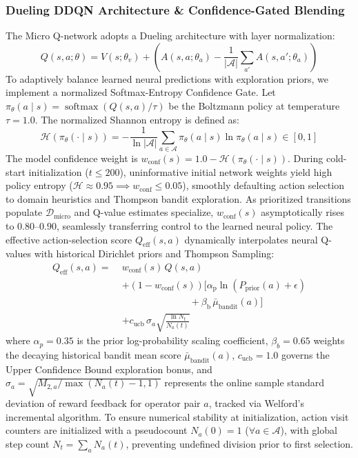 \subsubsection{Dueling DDQN Architecture \& Confidence-Gated Blending}
The Micro Q-network adopts a Dueling architecture \cite{wang2016dueling} with layer normalization:
\begin{equation}
  Q(s, a; \theta) = V(s; \theta_v) + \left( A(s, a; \theta_a) - \frac{1}{|\mathcal{A}|} \sum_{a'} A(s, a'; \theta_a) \right)
  \label{eq:dueling_q}
\end{equation}
To adaptively balance learned neural predictions with exploration priors, we implement a normalized Softmax-Entropy Confidence Gate. Let $\pi_{\theta}(a \mid s) = \operatorname{softmax}(Q(s, a)/\tau)$ be the Boltzmann policy at temperature $\tau = 1.0$. The normalized Shannon entropy is defined as:
\begin{equation}
  \mathcal{H}(\pi_{\theta}(\cdot \mid s)) = -\frac{1}{\ln |\mathcal{A}|} \sum_{a \in \mathcal{A}} \pi_{\theta}(a \mid s) \ln \pi_{\theta}(a \mid s) \in [0, 1]
  \label{eq:policy_entropy}
\end{equation}
The model confidence weight is $w_{\text{conf}}(s) = 1.0 - \mathcal{H}(\pi_{\theta}(\cdot \mid s))$. During cold-start initialization ($t \le 200$), uninformative initial network weights yield high policy entropy ($\mathcal{H} \approx 0.95 \implies w_{\text{conf}} \le 0.05$), smoothly defaulting action selection to domain heuristics and Thompson bandit exploration. As prioritized transitions populate $\mathcal{D}_{\text{micro}}$ and Q-value estimates specialize, $w_{\text{conf}}(s)$ asymptotically rises to $0.80\text{--}0.90$, seamlessly transferring control to the learned neural policy. The effective action-selection score $Q_{\text{eff}}(s, a)$ dynamically interpolates neural Q-values with historical Dirichlet priors and Thompson Sampling:
\begin{align}
  Q_{\text{eff}}(s, a) = \; &w_{\text{conf}}(s)\,Q(s, a) \nonumber \\
  &+ (1 - w_{\text{conf}}(s))\Big[ \alpha_{\text{p}}\ln(P_{\text{prior}}(a) + \epsilon) \nonumber \\
  &\qquad\qquad\qquad\quad + \beta_{\text{b}}\,\bar{\mu}_{\text{bandit}}(a) \Big] \nonumber \\
  &+ c_{\text{ucb}}\,\sigma_a \sqrt{\frac{\ln N_t}{N_a(t)}}
  \label{eq:q_eff_blending}
\end{align}
where $\alpha_p = 0.35$ is the prior log-probability scaling coefficient, $\beta_b = 0.65$ weights the decaying historical bandit mean score $\bar{\mu}_{\text{bandit}}(a)$, $c_{\text{ucb}} = 1.0$ governs the Upper Confidence Bound exploration bonus, and $\sigma_a = \sqrt{M_{2, a}/\max(N_a(t) - 1, 1)}$ represents the online sample standard deviation of reward feedback for operator pair $a$, tracked via Welford's incremental algorithm. To ensure numerical stability at initialization, action visit counters are initialized with a pseudocount $N_a(0) = 1$ ($\forall a \in \mathcal{A}$), with global step count $N_t = \sum_{a} N_a(t)$, preventing undefined division prior to first selection.

